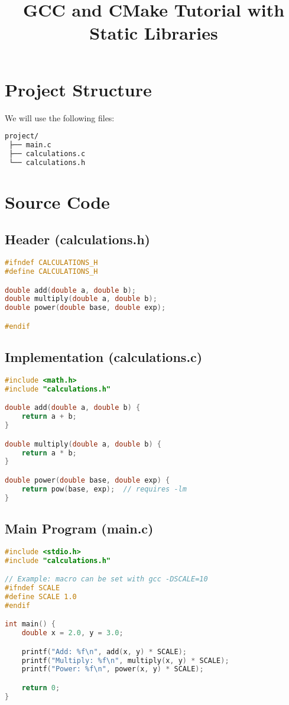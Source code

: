 \documentclass[11pt,a4paper]{article}
\title{GCC and CMake Tutorial with Static Libraries}
\author{}
\date{}
\begin{document}
\maketitle

\section{Project Structure}
We will use the following files:
\begin{lstlisting}[language=bash]
project/
 ├── main.c
 ├── calculations.c
 └── calculations.h
\end{lstlisting}

\section{Source Code}

\subsection{Header (calculations.h)}
\begin{lstlisting}[language=C]
#ifndef CALCULATIONS_H
#define CALCULATIONS_H

double add(double a, double b);
double multiply(double a, double b);
double power(double base, double exp);

#endif
\end{lstlisting}

\subsection{Implementation (calculations.c)}
\begin{lstlisting}[language=C]
#include <math.h>
#include "calculations.h"

double add(double a, double b) {
    return a + b;
}

double multiply(double a, double b) {
    return a * b;
}

double power(double base, double exp) {
    return pow(base, exp);  // requires -lm
}
\end{lstlisting}

\subsection{Main Program (main.c)}
\begin{lstlisting}[language=C]
#include <stdio.h>
#include "calculations.h"

// Example: macro can be set with gcc -DSCALE=10
#ifndef SCALE
#define SCALE 1.0
#endif

int main() {
    double x = 2.0, y = 3.0;

    printf("Add: %f\n", add(x, y) * SCALE);
    printf("Multiply: %f\n", multiply(x, y) * SCALE);
    printf("Power: %f\n", power(x, y) * SCALE);

    return 0;
}
\end{lstlisting}
\end{document}
